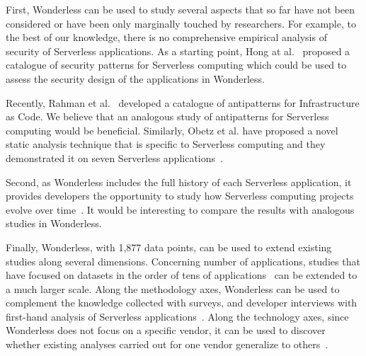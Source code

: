 First, Wonderless can be used to study several aspects that so far have not
been considered or have been only marginally touched by researchers.
For example, to the best of our knowledge, there is no comprehensive 
empirical analysis of security of Serverless applications. 
As a starting point, Hong at al.~\cite{216833} proposed a catalogue of
security patterns for Serverless computing which could be used to assess
the security design of the applications in Wonderless.

%
Recently, Rahman et al.~\cite{DBLP:journals/ese/RahmanFW20} developed a 
catalogue of antipatterns for Infrastructure as Code. We believe that an 
analogous study of antipatterns for Serverless computing would be beneficial.
Similarly, Obetz et al. have proposed a novel static analysis technique that is  
specific to Serverless computing and they demonstrated it on 
seven Serverless applications~\cite{10.5555/3357034.3357059}.

Second, as Wonderless includes the full history of each Serverless application, 
it provides developers the opportunity to study how Serverless computing 
projects evolve over time~\cite{sousa2020characterizing, du2020understanding, wen2020empirical}. 
It would be interesting to compare the results with analogous studies in Wonderless.

Finally, Wonderless, with 1,877 data points, can be used to extend existing 
studies along several dimensions. Concerning number of applications,
studies that have focused on datasets in the order of tens of 
applications~\cite{eismann2020serverless} can be extended to a much larger scale.
Along the methodology axes, Wonderless can be used to complement the knowledge collected 
with surveys, and developer interviews with first-hand analysis of
Serverless applications~\cite{leitner2019mixed}.
Along the technology axes, since Wonderless does not focus on a specific vendor, it can be used
to discover whether existing analyses carried out for one vendor
generalize to others~\cite{spillner2019quantitative}.











